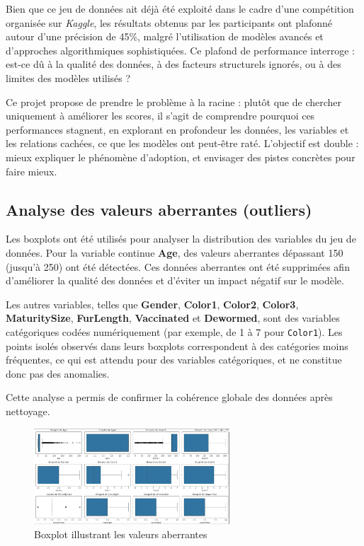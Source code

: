 \documentclass[a4paper,12pt]{article}
\begin{document}
Bien que ce jeu de données ait déjà été exploité dans le cadre d’une compétition organisée sur \textit{Kaggle}, les résultats obtenus par les participants ont plafonné autour d'une précision de 45\%, malgré l’utilisation de modèles avancés et d’approches algorithmiques sophistiquées. Ce plafond de performance interroge : est-ce dû à la qualité des données, à des facteurs structurels ignorés, ou à des limites des modèles utilisés ?

Ce projet propose de prendre le problème à la racine : plutôt que de chercher uniquement à améliorer les scores, il s'agit de comprendre pourquoi ces performances stagnent, en explorant en profondeur les données, les variables et les relations cachées, ce que les modèles ont peut-être raté. L’objectif est double : mieux expliquer le phénomène d’adoption, et envisager des pistes concrètes pour faire mieux.

\subsection{Analyse des valeurs aberrantes (outliers)}

Les boxplots ont été utilisés pour analyser la distribution des variables du jeu de données. Pour la variable continue \textbf{Age}, des valeurs aberrantes dépassant 150 (jusqu'à 250) ont été détectées. Ces données aberrantes ont été supprimées afin d'améliorer la qualité des données et d'éviter un impact négatif sur le modèle.

Les autres variables, telles que \textbf{Gender}, \textbf{Color1}, \textbf{Color2}, \textbf{Color3}, \textbf{MaturitySize}, \textbf{FurLength}, \textbf{Vaccinated} et \textbf{Dewormed}, sont des variables catégoriques codées numériquement (par exemple, de 1 à 7 pour \texttt{Color1}). Les points isolés observés dans leurs boxplots correspondent à des catégories moins fréquentes, ce qui est attendu pour des variables catégoriques, et ne constitue donc pas des anomalies.

Cette analyse a permis de confirmer la cohérence globale des données après nettoyage.

\begin{figure}[H]
    \centering
    \includegraphics[width=0.65\textwidth]{boxplot_age_outliers.png}
    \caption{Boxplot illustrant les valeurs aberrantes}
    \label{fig:outliers_age}
\end{figure}
\end{document}
